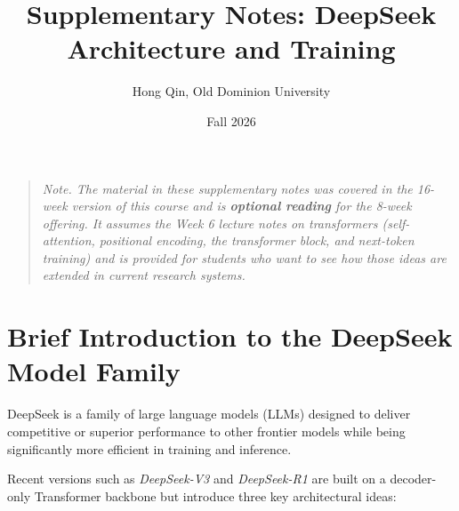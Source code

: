 \documentclass[11pt]{article}
\title{Supplementary Notes: DeepSeek Architecture and Training}
\author{Hong Qin, Old Dominion University}
\date{Fall 2026}
\theoremstyle{remark}
\begin{document}
\maketitle

\begin{quote}\small\itshape Note. The material in these supplementary notes was covered in the 16-week version of this course and is \textbf{optional reading} for the 8-week offering. It assumes the Week 6 lecture notes on transformers (self-attention, positional encoding, the transformer block, and next-token training) and is provided for students who want to see how those ideas are extended in current research systems.\end{quote}

\tableofcontents
\newpage

\section{Brief Introduction to the DeepSeek Model Family}

DeepSeek is a family of large language models (LLMs) designed to deliver competitive or superior performance to other frontier models while being significantly more efficient in training and inference.

Recent versions such as \emph{DeepSeek-V3} and \emph{DeepSeek-R1} are built on a decoder-only Transformer backbone but introduce three key architectural ideas:
\end{document}
